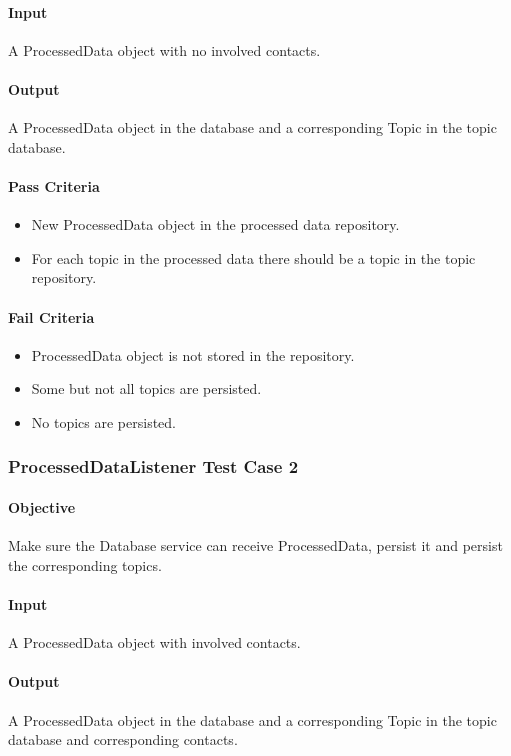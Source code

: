 \documentclass[hidelinks,english]{article}
\begin{document}
			\paragraph{Input} A ProcessedData object with no involved contacts.
			\paragraph{Output} A ProcessedData object in the database and a corresponding Topic in the topic database.
			\paragraph{Pass Criteria}
			\begin{itemize}
				\item New ProcessedData object in the processed data repository.
				\item For each topic in the processed data there should be a topic in the topic repository.
			\end{itemize}
			\paragraph{Fail Criteria}
			\begin{itemize}
				\item ProcessedData object is not stored in the repository.
				\item Some but not all topics are persisted.
				\item No topics are persisted.
			\end{itemize}
			
		\subsubsection{ProcessedDataListener Test Case 2}\label{databaseprocesseddatalistenertest2}
			\paragraph{Objective} Make sure the Database service can receive ProcessedData, persist it and persist the corresponding topics.
			\paragraph{Input} A ProcessedData object with involved contacts.
			\paragraph{Output} A ProcessedData object in the database and a corresponding Topic in the topic database and corresponding contacts.
\end{document}
